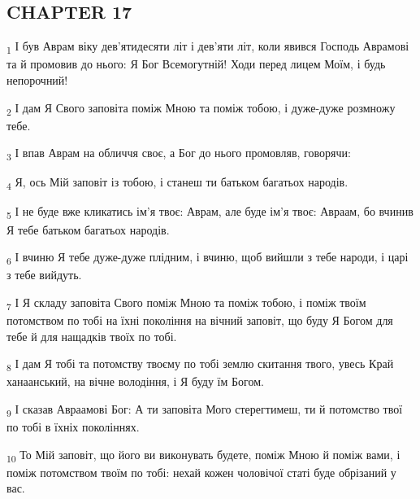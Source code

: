 \subsection{CHAPTER 17}
\begin{tcolorbox}
\textsubscript{1} І був Аврам віку дев'ятидесяти літ і дев'яти літ, коли явився Господь Аврамові та й промовив до нього: Я Бог Всемогутній! Ходи перед лицем Моїм, і будь непорочний!
\end{tcolorbox}
\begin{tcolorbox}
\textsubscript{2} І дам Я Свого заповіта поміж Мною та поміж тобою, і дуже-дуже розмножу тебе.
\end{tcolorbox}
\begin{tcolorbox}
\textsubscript{3} І впав Аврам на обличчя своє, а Бог до нього промовляв, говорячи:
\end{tcolorbox}
\begin{tcolorbox}
\textsubscript{4} Я, ось Мій заповіт із тобою, і станеш ти батьком багатьох народів.
\end{tcolorbox}
\begin{tcolorbox}
\textsubscript{5} І не буде вже кликатись ім'я твоє: Аврам, але буде ім'я твоє: Авраам, бо вчинив Я тебе батьком багатьох народів.
\end{tcolorbox}
\begin{tcolorbox}
\textsubscript{6} І вчиню Я тебе дуже-дуже плідним, і вчиню, щоб вийшли з тебе народи, і царі з тебе вийдуть.
\end{tcolorbox}
\begin{tcolorbox}
\textsubscript{7} І Я складу заповіта Свого поміж Мною та поміж тобою, і поміж твоїм потомством по тобі на їхні покоління на вічний заповіт, що буду Я Богом для тебе й для нащадків твоїх по тобі.
\end{tcolorbox}
\begin{tcolorbox}
\textsubscript{8} І дам Я тобі та потомству твоєму по тобі землю скитання твого, увесь Край ханаанський, на вічне володіння, і Я буду їм Богом.
\end{tcolorbox}
\begin{tcolorbox}
\textsubscript{9} І сказав Авраамові Бог: А ти заповіта Мого стерегтимеш, ти й потомство твої по тобі в їхніх поколіннях.
\end{tcolorbox}
\begin{tcolorbox}
\textsubscript{10} То Мій заповіт, що його ви виконувать будете, поміж Мною й поміж вами, і поміж потомством твоїм по тобі: нехай кожен чоловічої статі буде обрізаний у вас.
\end{tcolorbox}
